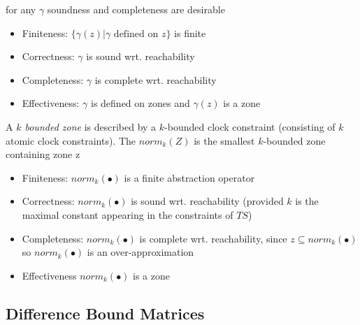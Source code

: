 \documentclass[a4paper, 10pt]{article}
\begin{document}
\begin{mdframed}
\begin{itemize}
\end{itemize}
for any $\gamma$ soundness and completeness are desirable
\begin{itemize}
    \item Finiteness: $\{\gamma(z)|\gamma \text{ defined on } z\}$ is finite
    \item Correctness: $\gamma$ is sound wrt. reachability
    \item Completeness: $\gamma$ is complete wrt. reachability
    \item Effectiveness: $\gamma$ is defined on zones and $\gamma(z)$ is a zone
\end{itemize}
A \emph{$k$ bounded zone} is described by a $k$-bounded clock constraint (consisting of $k$ atomic clock constraints). The \emph{$norm_k(Z)$} is the smallest $k$-bounded zone containing zone z
\begin{center}
\scalebox{.7}{}
\end{center}
\begin{itemize}
    \item Finiteness: $norm_k(\bullet)$ is a finite abstraction operator
    \item Correctness: $norm_k(\bullet)$ is sound wrt. reachability (provided $k$ is the maximal constant appearing in the constraints of $TS$)
    \item Completeness: $norm_k(\bullet)$ is complete wrt. reachability, since $z\subseteq norm_k(\bullet)$ so $norm_k(\bullet)$ is an over-approximation
    \item Effectiveness $norm_k(\bullet)$ is a zone
\end{itemize}
\end{mdframed}

\subsection{Difference Bound Matrices}
\end{document}
